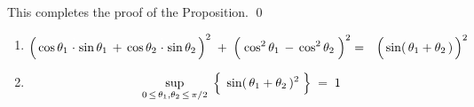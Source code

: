 This completes the proof of the Proposition.
\qed


\begin{lemma}
\mbox{}\vskip -0.5cm
\begin{enumerate}
\item
	\begin{eqnarray*}
	\left(\,
		\cos\theta_{1}\overset{{\color{white}1}}{\cdot}\sin\theta_{1}
		\, + \,
		\cos\theta_{2}\overset{{\color{white}1}}{\cdot}\sin\theta_{2}
		\,\right)^{2}
		\; + \;
	\left(\; \cos^{2}\theta_{1} \, \overset{{\color{white}.}}{-} \, \cos^{2}\theta_{2} \;\right)^{2}
	& = &
		\left(\,\sin(\,\theta_{1} \overset{{\color{white}.}}{+} \theta_{2}\,) \,\right)^{2}
	\end{eqnarray*}
\item
	\begin{equation*}
	\underset{0\,\leq\,\theta_{1},\theta_{2}\,\leq\,\pi/2}{\sup}\;
	\left\{\;\,\sin(\,\theta_{1} \overset{{\color{white}.}}{+} \theta_{2}\,)^{2}\;\right\} \; = \; 1
	\end{equation*}
\end{enumerate}
\end{lemma}
\proof
